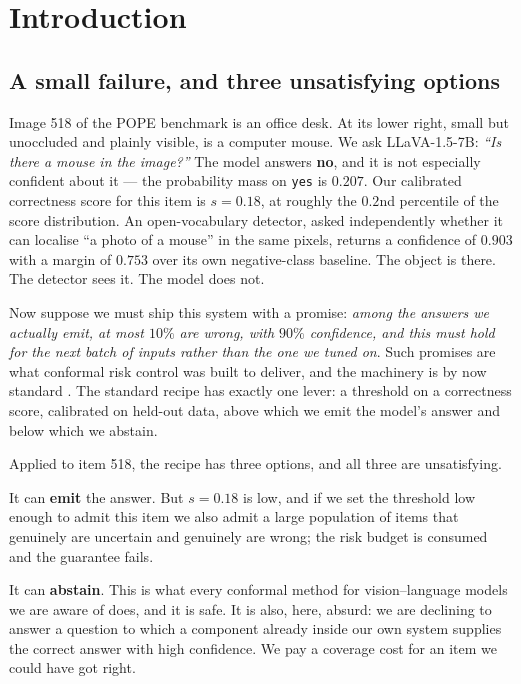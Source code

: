 \documentclass{article}
\theoremstyle{plain}
\theoremstyle{definition}
\theoremstyle{remark}
\begin{document}
\section{Introduction}
\label{sec:intro}

\subsection{A small failure, and three unsatisfying options}

Image 518 of the POPE benchmark is an office desk. At its lower right, small but unoccluded and
plainly visible, is a computer mouse. We ask LLaVA-1.5-7B: \emph{``Is
there a mouse in the image?''} The model answers \textbf{no}, and it is not especially
confident about it --- the probability mass on \texttt{yes} is $0.207$. Our calibrated
correctness score for this item is $s=0.18$, at roughly the $0.2$nd percentile of the score distribution. An
open-vocabulary detector, asked independently whether it can localise ``a photo of a
mouse'' in the same pixels, returns a confidence of $0.903$ with a margin of $0.753$ over
its own negative-class baseline. The object is there. The detector sees it. The model
does not.

Now suppose we must ship this system with a promise: \emph{among the answers we actually
emit, at most $10\%$ are wrong, with $90\%$ confidence, and this must hold for the next
batch of inputs rather than the one we tuned on}. Such promises are what conformal risk
control was built to deliver, and the machinery is by now standard
\citep{vovk2005,bates2021rcps,angelopoulos2021ltt}. The standard recipe has exactly one
lever: a threshold on a correctness score, calibrated on held-out data, above which we
emit the model's answer and below which we abstain.

Applied to item 518, the recipe has three options, and all three are unsatisfying.

It can \textbf{emit} the answer. But $s=0.18$ is low, and if we set the threshold low
enough to admit this item we also admit a large population of items that genuinely are
uncertain and genuinely are wrong; the risk budget is consumed and the guarantee fails.

It can \textbf{abstain}. This is what every conformal method for vision--language models
we are aware of does, and it is safe. It is also, here, absurd: we are declining to answer
a question to which a component already inside our own system supplies the correct answer
with high confidence. We pay a coverage cost for an item we could have got right.
\end{document}
